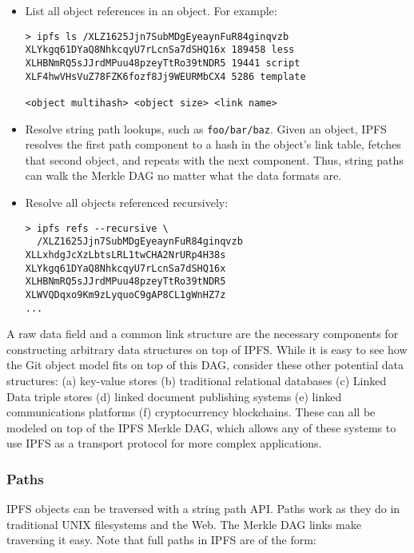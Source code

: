 \documentclass{sig-alternate}
\begin{document}
\begin{itemize}

  \item List all object references in an object. For example:
\begin{verbatim}
> ipfs ls /XLZ1625Jjn7SubMDgEyeaynFuR84ginqvzb
XLYkgq61DYaQ8NhkcqyU7rLcnSa7dSHQ16x 189458 less
XLHBNmRQ5sJJrdMPuu48pzeyTtRo39tNDR5 19441 script
XLF4hwVHsVuZ78FZK6fozf8Jj9WEURMbCX4 5286 template

<object multihash> <object size> <link name>
\end{verbatim}

  \item Resolve string path lookups, such as \texttt{foo/bar/baz}. Given an object, IPFS resolves the first path component to a hash in the object's link table, fetches that second object, and repeats with the next component. Thus, string paths can walk the Merkle DAG no matter what the data formats are.

  \item Resolve all objects referenced recursively:
\begin{verbatim}
> ipfs refs --recursive \
  /XLZ1625Jjn7SubMDgEyeaynFuR84ginqvzb
XLLxhdgJcXzLbtsLRL1twCHA2NrURp4H38s
XLYkgq61DYaQ8NhkcqyU7rLcnSa7dSHQ16x
XLHBNmRQ5sJJrdMPuu48pzeyTtRo39tNDR5
XLWVQDqxo9Km9zLyquoC9gAP8CL1gWnHZ7z
...
\end{verbatim}

\end{itemize}


A raw data field and a common link structure are the necessary components for constructing arbitrary data structures on top of IPFS. While it is easy to see how the Git object model fits on top of this DAG, consider these other potential data structures:
(a) key-value stores
(b) traditional relational databases
(c) Linked Data triple stores
(d) linked document publishing systems
(e) linked communications platforms
(f) cryptocurrency blockchains.
These can all be modeled on top of the IPFS Merkle DAG, which allows any of these systems to use IPFS as a transport protocol for more complex applications.

\subsubsection{Paths}

IPFS objects can be traversed with a string path API. Paths work as they do in traditional UNIX filesystems and the Web. The Merkle DAG links make traversing it easy. Note that full paths in IPFS are of the form:
\end{document}
